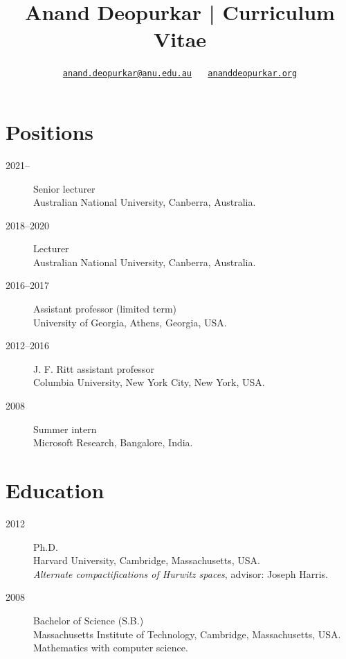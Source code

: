 \documentclass[11pt]{article}
\author{\href{mailto:anand.deopurkar@anu.edu.au}{\texttt{anand.deopurkar@anu.edu.au}} \(\quad\) \href{https://www.ananddeopurkar.org}{\texttt{ananddeopurkar.org}}}
\date{}
\title{Anand Deopurkar | Curriculum Vitae}
\begin{document}
\maketitle
\section*{Positions}
\label{sec:org0453731}
\label{org08b88c3}
\begin{description}
\item[{2021--}] Senior lecturer\\
Australian National University, Canberra, Australia.
\item[{2018--2020}] Lecturer\\
Australian National University, Canberra, Australia.
\item[{2016--2017}] Assistant professor (limited term)\\
University of Georgia, Athens, Georgia, USA.
\item[{2012--2016}] J. F. Ritt assistant professor\\
Columbia University, New York City, New York, USA.
\item[{2008}] Summer intern\\
Microsoft Research, Bangalore, India.
\end{description}
\section*{Education}
\label{sec:orgd646030}

\label{orgffe754d}
\begin{description}
\item[{2012}] Ph.D.\\
Harvard University, Cambridge, Massachusetts, USA.\\
      \emph{Alternate compactifications of Hurwitz spaces}, advisor: Joseph Harris.
\item[{2008}] Bachelor of Science (S.B.)\\
Massachusetts Institute of Technology, Cambridge, Massachusetts, USA.\\
      Mathematics with computer science.
\end{description}
\end{document}
